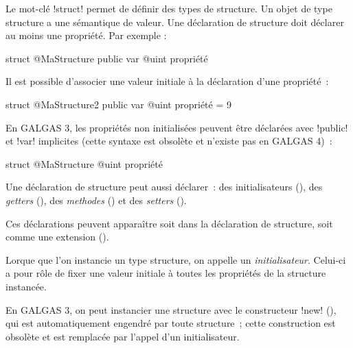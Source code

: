 




Le mot-clé \ggst!struct! permet de définir des types de structure. Un objet de type structure a une sémantique de valeur. Une déclaration de structure doit déclarer au moins une propriété. Par exemple :

\begin{galgas34}
struct @MaStructure {
  public var @uint propriété
}
\end{galgas34}

Il est possible d'associer une valeur initiale à la déclaration d'une propriété~:
\begin{galgas34}
struct @MaStructure2 {
  public var @uint propriété = 9
}
\end{galgas34}

En GALGAS 3, les propriétés non initialisées peuvent être déclarées avec \ggst!public! et \ggst!var! implicites (cette syntaxe est obsolète et n'existe pas en GALGAS 4)~:
\begin{galgas3}
struct @MaStructure {
  @uint propriété
}
\end{galgas3}

Une déclaration de structure peut aussi déclarer~: des initialisateurs (), des \emph{getters} (), des \emph{methodes} () et des \emph{setters} ().

Ces déclarations peuvent apparaître soit dans la déclaration de structure, soit comme une extension ().













Lorque que l'on instancie un type structure, on appelle un \emph{initialisateur}. Celui-ci a pour rôle de fixer une valeur initiale à toutes les propriétés de la structure instancée.

En GALGAS 3, on peut instancier une structure avec le constructeur \ggst!new! (), qui est automatiquement engendré par toute structure~; cette construction est obsolète et est remplacée par l'appel d'un initialisateur.

